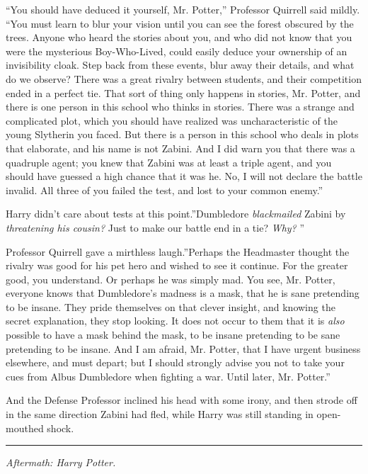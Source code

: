 ``You should have deduced it yourself, Mr. Potter,'' Professor Quirrell
said mildly. ``You must learn to blur your vision until you can see the
forest obscured by the trees. Anyone who heard the stories about you,
and who did not know that you were the mysterious Boy-Who-Lived, could
easily deduce your ownership of an invisibility cloak. Step back from
these events, blur away their details, and what do we observe? There was
a great rivalry between students, and their competition ended in a
perfect tie. That sort of thing only happens in stories, Mr. Potter, and
there is one person in this school who thinks in stories. There was a
strange and complicated plot, which you should have realized was
uncharacteristic of the young Slytherin you faced. But there is a person
in this school who deals in plots that elaborate, and his name is not
Zabini. And I did warn you that there was a quadruple agent; you knew
that Zabini was at least a triple agent, and you should have guessed a
high chance that it was he. No, I will not declare the battle invalid.
All three of you failed the test, and lost to your common enemy.''

Harry didn't care about tests at this point.''Dumbledore
\emph{blackmailed} Zabini by \emph{threatening his cousin?} Just to make
our battle end in a tie? \emph{Why?} ''

Professor Quirrell gave a mirthless laugh.''Perhaps the Headmaster
thought the rivalry was good for his pet hero and wished to see it
continue. For the greater good, you understand. Or perhaps he was simply
mad. You see, Mr. Potter, everyone knows that Dumbledore's madness is a
mask, that he is sane pretending to be insane. They pride themselves on
that clever insight, and knowing the secret explanation, they stop
looking. It does not occur to them that it is \emph{also} possible to
have a mask behind the mask, to be insane pretending to be sane
pretending to be insane. And I am afraid, Mr. Potter, that I have urgent
business elsewhere, and must depart; but I should strongly advise you
not to take your cues from Albus Dumbledore when fighting a war. Until
later, Mr. Potter.''

And the Defense Professor inclined his head with some irony, and then
strode off in the same direction Zabini had fled, while Harry was still
standing in open-mouthed shock.

\begin{center}\rule{3in}{0.4pt}\end{center}

\emph{Aftermath: Harry Potter.}


